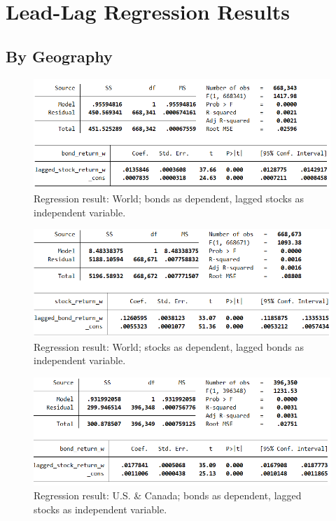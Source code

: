 \chapter{Lead-Lag Regression Results} \label{appendix-regression}

\section{By Geography}

\begin{figure}[h]
	\centering
	\includegraphics[width=1.0\linewidth]{figures/regression-results/regression-world-bonds-as-dependent.PNG}
	\caption{Regression result: World; bonds as dependent, lagged stocks as independent variable. }
	\label{fig:regression-world-bonds-as-dependent}
\end{figure}

\begin{figure}[h]
	\centering
	\includegraphics[width=1.0\linewidth]{figures/regression-results/regression-world-stocks-as-dependent.PNG}
	\caption{Regression result: World; stocks as dependent, lagged bonds as independent variable. }
	\label{fig:regression-world-stocks-as-dependent}
\end{figure}

\begin{figure}[h]
	\centering
	\includegraphics[width=1.0\linewidth]{figures/regression-results/regression-na-bonds-as-dependent.PNG}
	\caption{Regression result: U.S. \& Canada; bonds as dependent, lagged stocks as independent variable. }
	\label{fig:regression-na-bonds-as-dependent}
\end{figure}

